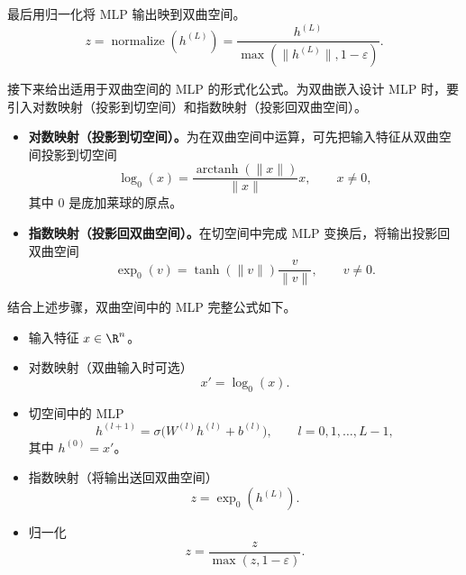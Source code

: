 最后用归一化将 MLP 输出映到双曲空间。
\[
  z=\operatorname{normalize}(h^{(L)})
    =\frac{h^{(L)}}{\max(\lVert h^{(L)}\rVert,1-\varepsilon)}.
\]

接下来给出适用于双曲空间的 MLP 的形式化公式。为双曲嵌入设计 MLP 时，要引入对数映射（投影到切空间）和指数映射（投影回双曲空间）。
\begin{itemize}
  \item \textbf{对数映射（投影到切空间）。}为在双曲空间中运算，可先把输入特征从双曲空间投影到切空间
  \begin{equation*}
    \log_0(x)=\frac{\operatorname{arctanh}(\lVert x\rVert)}{\lVert x\rVert}x,
      \qquad x\neq0,
    \tag{2.132}\label{eq:2.132}
  \end{equation*}
  其中 $0$ 是庞加莱球的原点。
  \item \textbf{指数映射（投影回双曲空间）。}在切空间中完成 MLP 变换后，将输出投影回双曲空间
  \begin{equation*}
    \exp_0(v)=\tanh(\lVert v\rVert)\frac{v}{\lVert v\rVert},
      \qquad v\neq0.
    \tag{2.133}\label{eq:2.133}
  \end{equation*}
\end{itemize}

结合上述步骤，双曲空间中的 MLP 完整公式如下。
\begin{itemize}
  \item 输入特征 $x\in\R^n$。
  \item 对数映射（双曲输入时可选）
  \[
    x'=\log_0(x).
  \]
  \item 切空间中的 MLP
  \begin{equation*}
    h^{(l+1)}=\sigma\bigl(W^{(l)}h^{(l)}+b^{(l)}\bigr),
    \qquad l=0,1,\ldots,L-1,
    \tag{2.134}\label{eq:2.134}
  \end{equation*}
  其中 $h^{(0)}=x'$。
  \item 指数映射（将输出送回双曲空间）
  \begin{equation*}
    z=\exp_0(h^{(L)}).
    \tag{2.135}\label{eq:2.135}
  \end{equation*}
  \item 归一化
  \begin{equation*}
    z=\frac{z}{\max(z,1-\varepsilon)}.
    \tag{2.136}\label{eq:2.136}
  \end{equation*}
\end{itemize}


